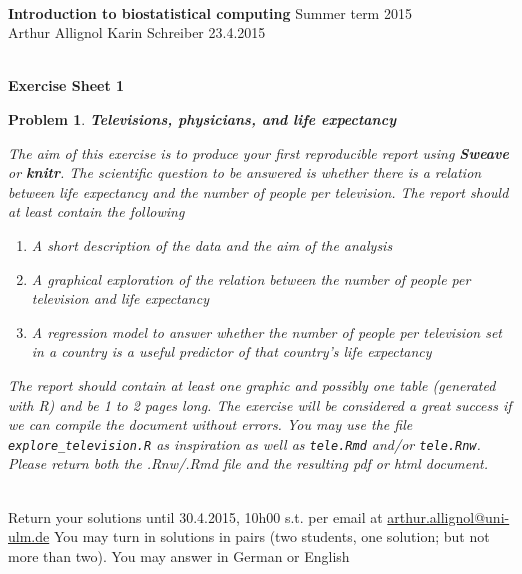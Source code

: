 \documentclass[11pt, german]{article}
\makeatletter
\newcounter{ka}
\newtheorem{exercise}{Problem}
\newenvironment{aufgabe}{\begin{exercise}\rm}{\end{exercise} \bigskip}
\newcommand{\footer}{ \vfill
  \mbox{}\hrulefill\\
  Return your solutions until 30.4.2015, 10h00 s.t. per email at
  \url{arthur.allignol@uni-ulm.de} You may turn in solutions in pairs
  (two students, one solution; but not more than two). You may answer
  in German or English}
\makeatother
\begin{document}

\renewcommand{\baselinestretch}{1}

\hrulefill\\
{\bf Introduction to biostatistical computing} \hspace{\fill} Summer term 2015\\
Arthur Allignol \quad\quad Karin Schreiber \hspace{\fill} 23.4.2015\\[-1.2ex]
\mbox{}\hrulefill\\
\newline \renewcommand{\baselinestretch}{1}
\setcounter{ka}{0} \vspace{-0.5cm}



\begin{center}
\large{{\bf Exercise Sheet 1}}
\end{center}

\begin{aufgabe}{{\bf Televisions, physicians, and life expectancy}}

  The aim of this exercise is to produce your first reproducible
  report using {\bf Sweave} or {\bf knitr}. The scientific question to
  be answered is whether there is a relation between life expectancy
  and the number of people per television. The report should at least
  contain the following
  \begin{enumerate}
  \item A short description of the data and the aim of the analysis
  \item A graphical exploration of the relation between the number of
    people per television and life expectancy
  \item A regression model to answer whether the number of people per
    television set in a country is a useful predictor of that
    country's life expectancy
  \end{enumerate}
  The report should contain at least one graphic and possibly one
  table (generated with R) and be 1 to 2 pages long. The exercise will
  be considered a great success if we can compile the document without
  errors. You may use the file {\tt explore\_television.R} as
  inspiration as well as {\tt tele.Rmd} and/or {\tt tele.Rnw}. Please
  return both the .Rnw/.Rmd file and the resulting pdf or html
  document.
\end{aufgabe}

\footer
\end{document}
